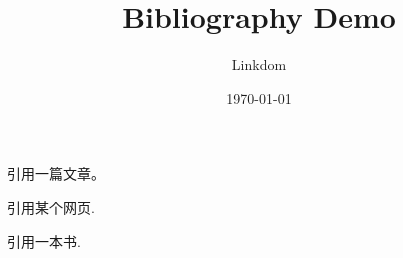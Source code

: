 \documentclass{article}
\title{Bibliography Demo}
\author{Linkdom}
\date{\today}
\begin{document}
\maketitle

引用一篇文章\cite{greenwade93}。

引用某个网页\cite{latex_wiki}.

引用一本书\cite{rombach2021highresolution}.





\end{document}
